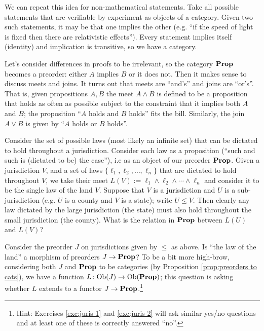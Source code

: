 \begin{example}
We can repeat this idea for non-mathematical statements. Take all possible statements that are verifiable by experiment as objects of a category. Given two such statements, it may be that one implies the other (e.g. “if the speed of light is fixed then there are relativistic effects”). Every statement implies itself (identity) and implication is transitive, so we have a category. 
\end{example}

Let's consider differences in proofs to be irrelevant, so the category ${\bf Prop}$ becomes a preorder: either $A$ implies $B$ or it does not. Then it makes sense to discuss meets and joins. It turns out that meets are “and's” and joins are “or's”. That is, given propositions $A,B$ the meet $A\wedge B$ is defined to be a proposition that holds as often as possible subject to the constraint that it implies both $A$ and $B$; the proposition “$A$ holds and $B$ holds” fits the bill. Similarly, the join $A\vee B$ is given by “$A$ holds or $B$ holds”.

\begin{exercise}\label{exc:juris 1}
Consider the set of possible laws (most likely an infinite set) that can be dictated to hold throughout a jurisdiction. Consider each law as a proposition (“such and such is (dictated to be) the case”), i.e as an object of our preorder ${\bf Prop}$. Given a jurisdiction $V$, and a set of laws $\{\ell_1,\ell_2,\ldots,\ell_n\}$ that are dictated to hold throughout $V$, we take their meet $L(V):=\ell_1\wedge\ell_2\wedge\cdots\wedge\ell_n$ and consider it to be the single law of the land $V$. Suppose that $V$ is a jurisdiction and $U$ is a sub-jurisdiction (e.g. $U$ is a county and $V$ is a state); write $U\leq V$. Then clearly any law dictated by the large jurisdiction (the state) must also hold throughout the small jurisdiction (the county).
\sexc What is the relation in ${\bf Prop}$ between $L(U)$ and $L(V)$?
\item Consider the preorder $J$ on jurisdictions given by $\leq$ as above. Is “the law of the land” a morphism of preorders $J\rightarrow{\bf Prop}$? To be a bit more high-brow, considering both $J$ and ${\bf Prop}$ to be categories (by Proposition \ref{prop:preorders to cats}), we have a function $L\colon\textnormal{Ob}(J)\rightarrow\textnormal{Ob}({\bf Prop})$; this question is asking whether $L$ extends to a functor $J\rightarrow{\bf Prop}$.\footnote{Hint: Exercises \ref{exc:juris 1} and \ref{exc:juris 2} will ask similar yes/no questions and at least one of these is correctly answered “no”.}
\endsexc
\end{exercise}

